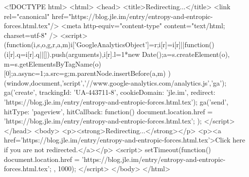 <!DOCTYPE html>
<html>
<head>
<title>Redirecting...</title>
<link rel="canonical" href="https://blog.jle.im/entry/entropy-and-entropic-forces.html.tex"/>
<meta http-equiv="content-type" content="text/html; charset=utf-8" />
<script>
(function(i,s,o,g,r,a,m){i['GoogleAnalyticsObject']=r;i[r]=i[r]||function(){
(i[r].q=i[r].q||[]).push(arguments)},i[r].l=1*new Date();a=s.createElement(o),
m=s.getElementsByTagName(o)[0];a.async=1;a.src=g;m.parentNode.insertBefore(a,m)
})(window,document,'script','//www.google-analytics.com/analytics.js','ga');
ga('create', { trackingId: 'UA-443711-8', cookieDomain: 'jle.im', redirect: 'https://blog.jle.im/entry/entropy-and-entropic-forces.html.tex'});
ga('send', { hitType: 'pageview', hitCallback: function() { document.location.href = 'https://blog.jle.im/entry/entropy-and-entropic-forces.html.tex'; } });
</script>
</head>
<body>
  <p><strong>Redirecting...</strong></p>
  <p><a href='https://blog.jle.im/entry/entropy-and-entropic-forces.html.tex'>Click here if you are not redirected.</a></p>
  <script>
    setTimeout(function() { document.location.href = 'https://blog.jle.im/entry/entropy-and-entropic-forces.html.tex'; }, 1000);
  </script>
</body>
</html>
